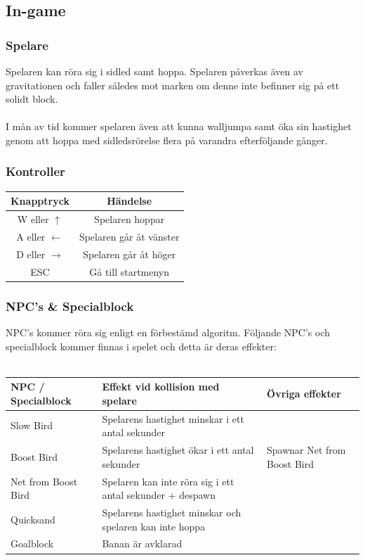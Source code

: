 \documentclass{TDP003mall}
\begin{document}
\subsection{In-game}
\subsubsection{Spelare}
Spelaren kan röra sig i sidled samt hoppa. Spelaren påverkas även av gravitationen och faller således mot marken om denne inte befinner sig på ett solidt block.
\\\\
I mån av tid kommer spelaren även att kunna walljumpa samt öka sin hastighet genom att hoppa med sidledsrörelse flera på varandra efterföljande gånger.
\subsubsection{Kontroller}
\begin{tabular}{|c|c|}
\hline
\textbf{Knapptryck} & \textbf{Händelse} \\\hline
W eller $\uparrow$ & Spelaren hoppar \\\hline
A eller $\leftarrow$ & Spelaren går åt vänster \\\hline
D eller $\rightarrow$ & Spelaren går åt höger \\\hline
ESC & Gå till startmenyn \\\hline
\end{tabular}

\subsubsection{NPC's \& Specialblock}
NPC's kommer röra sig enligt en förbestämd algoritm. Följande NPC's och specialblock kommer finnas i spelet och detta är deras effekter:
\\\\
\begin{tabular}{|l|l|l|}
\hline
\textbf{NPC / Specialblock} & \textbf{Effekt vid kollision med spelare} & \textbf{Övriga effekter}\\\hline
Slow Bird & Spelarens hastighet minskar i ett antal sekunder & \\\hline
Boost Bird & Spelarens hastighet ökar i ett antal sekunder & Spawnar Net from Boost Bird\\\hline
Net from Boost Bird & Spelaren kan inte röra sig i ett antal sekunder + despawn & \\\hline
Quicksand & Spelarens hastighet minskar och spelaren kan inte hoppa & \\\hline
Goalblock & Banan är avklarad & \\\hline
\end{tabular}
\end{document}
